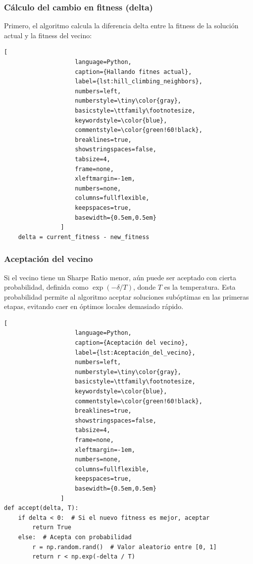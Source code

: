 \documentclass[9pt,a4paper,twoside]{rho-class/rho}
\begin{document}
            \subsubsection{Cálculo del cambio en fitness (delta)}
                Primero, el algoritmo calcula la diferencia delta entre la fitness de la solución actual y la fitness del vecino:
                \begin{lstlisting}[
                    language=Python,
                    caption={Hallando fitnes actual},
                    label={lst:hill_climbing_neighbors},
                    numbers=left,
                    numberstyle=\tiny\color{gray},
                    basicstyle=\ttfamily\footnotesize,
                    keywordstyle=\color{blue},
                    commentstyle=\color{green!60!black},
                    breaklines=true,
                    showstringspaces=false,
                    tabsize=4,
                    frame=none,
                    xleftmargin=-1em,
                    numbers=none,
                    columns=fullflexible,
                    keepspaces=true,
                    basewidth={0.5em,0.5em}
                ]
    delta = current_fitness - new_fitness
                \end{lstlisting}
            \subsubsection{Aceptación del vecino}
                Si el vecino tiene un Sharpe Ratio menor, aún puede ser aceptado con cierta probabilidad, definida como $\exp(-\delta/T)$, donde $T$ es la temperatura. Esta probabilidad permite al algoritmo aceptar soluciones subóptimas en las primeras etapas, evitando caer en óptimos locales demasiado rápido.
                \begin{lstlisting}[
                    language=Python,
                    caption={Aceptación del vecino},
                    label={lst:Aceptación_del_vecino},
                    numbers=left,
                    numberstyle=\tiny\color{gray},
                    basicstyle=\ttfamily\footnotesize,
                    keywordstyle=\color{blue},
                    commentstyle=\color{green!60!black},
                    breaklines=true,
                    showstringspaces=false,
                    tabsize=4,
                    frame=none,
                    xleftmargin=-1em,
                    numbers=none,
                    columns=fullflexible,
                    keepspaces=true,
                    basewidth={0.5em,0.5em}
                ]
def accept(delta, T):
    if delta < 0:  # Si el nuevo fitness es mejor, aceptar
        return True
    else:  # Acepta con probabilidad
        r = np.random.rand()  # Valor aleatorio entre [0, 1]
        return r < np.exp(-delta / T)
                \end{lstlisting}
\end{document}
